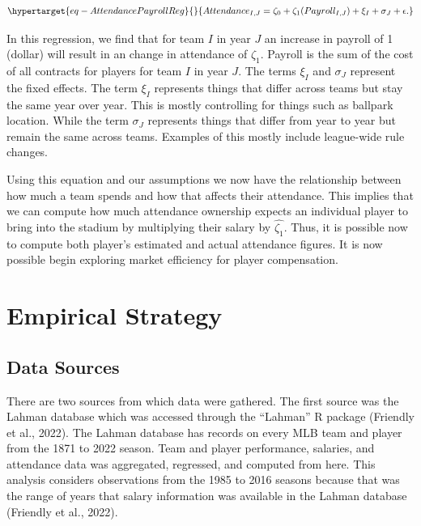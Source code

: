 \documentclass[
  12pt,
  letterpaper,
  DIV=11,
  numbers=noendperiod]{scrartcl}
\begin{document}
\begin{equation}\protect\hypertarget{eq-AttendancePayrollReg}{}{
Attendance_{I,J}=\zeta_0+\zeta_1(Payroll_{I,J})+\xi_I+\sigma_J+\epsilon.
}\label{eq-AttendancePayrollReg}\end{equation}

In this regression, we find that for team \(I\) in year \(J\) an
increase in payroll of 1 (dollar) will result in an change in attendance
of \(\zeta_1\). Payroll is the sum of the cost of all contracts for
players for team \(I\) in year \(J\). The terms \(\xi_I\) and
\(\sigma_J\) represent the fixed effects. The term \(\xi_I\) represents
things that differ across teams but stay the same year over year. This
is mostly controlling for things such as ballpark location. While the
term \(\sigma_J\) represents things that differ from year to year but
remain the same across teams. Examples of this mostly include
league-wide rule changes.

Using this equation and our assumptions we now have the relationship
between how much a team spends and how that affects their attendance.
This implies that we can compute how much attendance ownership expects
an individual player to bring into the stadium by multiplying their
salary by \(\widehat{\zeta_1}\). Thus, it is possible now to compute
both player's estimated and actual attendance figures. It is now
possible begin exploring market efficiency for player compensation.

\hypertarget{sec-Results}{%
\section{Empirical Strategy}\label{sec-Results}}

\hypertarget{sec-Data}{%
\subsection{Data Sources}\label{sec-Data}}

There are two sources from which data were gathered. The first source
was the Lahman database which was accessed through the ``Lahman'' R
package (Friendly et al., 2022). The Lahman database has records on
every MLB team and player from the 1871 to 2022 season. Team and player
performance, salaries, and attendance data was aggregated, regressed,
and computed from here. This analysis considers observations from the
1985 to 2016 seasons because that was the range of years that salary
information was available in the Lahman database (Friendly et al.,
2022).
\end{document}
